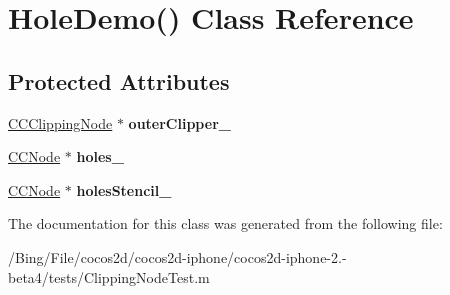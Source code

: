 \hypertarget{interface_hole_demo_07_08}{\section{Hole\-Demo() Class Reference}
\label{interface_hole_demo_07_08}
}
\subsection*{Protected Attributes}
\begin{DoxyCompactItemize}
\item 
\hypertarget{interface_hole_demo_07_08_a92ddf06fb5a74fe7327bf83d2b2e5473}{\hyperlink{interface_c_c_clipping_node}{C\-C\-Clipping\-Node} $\ast$ {\bfseries outer\-Clipper\-\_\-}}\label{interface_hole_demo_07_08_a92ddf06fb5a74fe7327bf83d2b2e5473}

\item 
\hypertarget{interface_hole_demo_07_08_a895125e7601be80cc282a79c7a7da070}{\hyperlink{class_c_c_node}{C\-C\-Node} $\ast$ {\bfseries holes\-\_\-}}\label{interface_hole_demo_07_08_a895125e7601be80cc282a79c7a7da070}

\item 
\hypertarget{interface_hole_demo_07_08_a2a348d2c31bd2a4a8f737ed4e5c26361}{\hyperlink{class_c_c_node}{C\-C\-Node} $\ast$ {\bfseries holes\-Stencil\-\_\-}}\label{interface_hole_demo_07_08_a2a348d2c31bd2a4a8f737ed4e5c26361}

\end{DoxyCompactItemize}


The documentation for this class was generated from the following file\-:\begin{DoxyCompactItemize}
\item 
/\-Bing/\-File/cocos2d/cocos2d-\/iphone/cocos2d-\/iphone-\/2.-\/beta4/tests/Clipping\-Node\-Test.\-m\end{DoxyCompactItemize}
